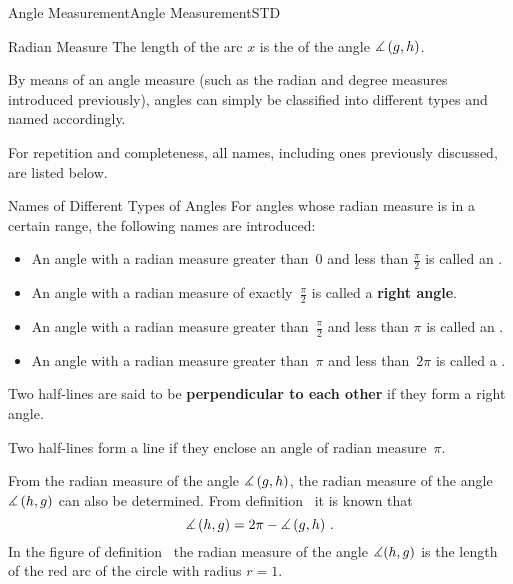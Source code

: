 \begin{MXContent}{Angle Measurement}{Angle Measurement}{STD}
\begin{MXInfo}{Radian Measure}
The length of the arc $x$ is the  of the
angle $\measuredangle \left( g, h \right)$.
\end{MXInfo}

By means of an angle measure (such as the radian and degree measures
introduced previously), angles can simply be classified into different types and named 
accordingly. 

For repetition and completeness, all names, including ones previously discussed, are listed 
below.

\begin{MXInfo}{Names of Different Types of Angles}
For angles whose radian measure is in a certain range, the following names 
are introduced:

\begin{itemize}
\item
An angle with a radian measure greater than~$0$ and less than $\frac{\pi}{2}$ is called an
.
       
\item
An angle with a radian measure of exactly~$\frac{\pi}{2}$ is called a \textbf{right angle}.
  
\item
An angle with a radian measure greater than~$\frac{\pi}{2}$ and less than $\pi$ is called 
an .
       
\item
An angle with a radian measure greater than~$\pi$ and less than~$2 \pi$ is called
a .
\end{itemize}

Two half-lines are said to be \textbf{perpendicular to each other} if they form a right angle.

Two half-lines form a line if they enclose an angle of radian measure~$\pi$.
\end{MXInfo}

From the radian measure of the angle $\measuredangle \left( g, h \right)$, the 
radian measure of the angle $\measuredangle \left( h, g \right)$  can also be determined. 
From definition~ it is known that
\[
   \Mmeasuredangle \left( h, g \right)
 = 2 \pi - \Mmeasuredangle \left( g, h \right)\,. %
\]
In the figure of definition~ the radian measure 
of the angle $\measuredangle(h,g)$ is the length of the red arc of the circle 
with radius $r = 1$.



\end{MXContent}
